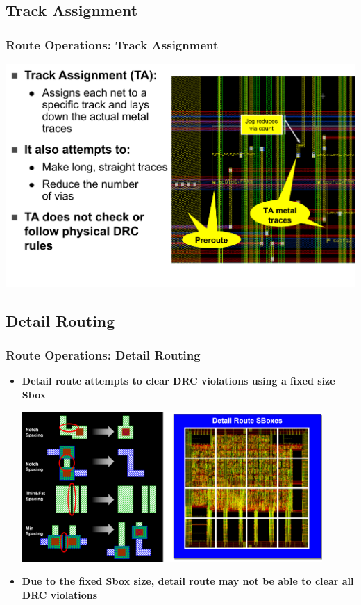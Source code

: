 \documentclass[compress]{beamer}
\begin{document}
\subsection[Track]{Track Assignment}
\begin{frame}
	\frametitle{Route Operations: Track Assignment}
	\begin{center}
		\includegraphics[width=\textwidth]{TRACK}
	\end{center}
\end{frame}	
\subsection[Detail]{Detail Routing}
\begin{frame}
	\frametitle{Route Operations: Detail Routing}
	\begin{itemize}
		\item \textbf{Detail route attempts to clear DRC violations using a fixed size Sbox}
		\begin{center}
			\includegraphics[width=0.9\textwidth]{Detail}
		\end{center}
	\item \textbf{Due to the fixed Sbox size, detail route may not be able to clear all DRC violations}	
	\end{itemize}
\end{frame}
\end{document}

